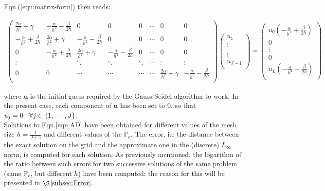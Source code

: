\documentclass[11pt]{article}
\theoremstyle{theorem}
\theoremstyle{definition}
\begin{document}
Eqn.(\ref{eqn:matrix-form}) then reads:

\begin{align*}
	\begin{pmatrix}
	\frac{2\alpha}{h^2}+\gamma & -\frac{\alpha}{h^2}-\frac{\beta}{2h} & 0 & 0 & 0 & \cdots & 0 & 0\\
	-\frac{\alpha}{h^2}+\frac{\beta}{2h} & \frac{2\alpha}{h^2}+\gamma & -\frac{\alpha}{h^2}-\frac{\beta}{2h} & 0 & 0 & \cdots & 0 & 0\\
	0 & -\frac{\alpha}{h^2}+\frac{\beta}{2h} & \frac{2\alpha}{h^2}+\gamma & -\frac{\alpha}{h^2}-\frac{\beta}{2h} & 0 & \cdots & 0 & 0\\
	\vdots & \vdots & \ddots & \ddots & \ddots & \cdots & \vdots & \vdots \\
	0 & 0 & \cdots & \cdots & \cdots & \cdots &  \frac{2\alpha}{h^2}+\gamma & -\frac{\alpha}{h^2}-\frac{\beta}{2h}\\
	\end{pmatrix}
	\begin{pmatrix}
	u_1\\
	\vdots\\
	\\
	\vdots\\
	u_{J-1}\\		
	\end{pmatrix}
	=
	\begin{pmatrix}
	u_0\left(-\frac{\alpha}{h^2}+\frac{\beta}{2h}\right)\\
	0\\
	\vdots\\
	0\\
	u_{L}\left(-\frac{\alpha}{h^2}-\frac{\beta}{2h}\right)\\		
	\end{pmatrix}
\end{align*}

where $\mathbf{u}$ is the initial guess required by the Gauss-Seidel algorithm to work. In the present case, each component of $\mathbf{u}$ has been set to $0$, so that $u_j=0\hspace{3mm}\forall j\in\lbrace 1,\cdots, J\rbrace$.\\
Solutions to  Eqn.\eqref{eqn:AD} have been obtained for different values of the mesh size $h=\frac{1}{J+1}$ and different values of the $\mathbb{P}_e$. The error, i.e the distance between the exact solution on the grid and the approximate one in the (discrete) $L_\infty$ norm, is computed for each solution. As previously mentioned, the logarithm of the ratio between such errors for two successive solutions of the same problem (same $\mathbb{P}_e$, but different $h$) have been computed: the reason for this will be presented in $\S$\ref{subsec:Error}.\\
\end{document}
